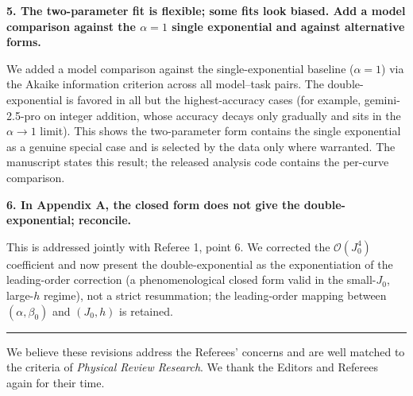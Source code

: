 \documentclass[11pt]{article}
\newcommand{\point}[1]{\medskip\noindent\textbf{#1}\par\nobreak}
\begin{document}
\point{5. The two-parameter fit is flexible; some fits look biased. Add a model comparison
against the $\alpha=1$ single exponential and against alternative forms.}
We added a model comparison against the single-exponential baseline ($\alpha=1$) via the Akaike
information criterion across all model--task pairs. The double-exponential is favored in all but
the highest-accuracy cases (for example, gemini-2.5-pro on integer addition, whose accuracy
decays only gradually and sits in the $\alpha\to1$ limit). This shows the two-parameter form
contains the single exponential as a genuine special case and is selected by the data only where
warranted. The manuscript states this result; the released analysis code contains the per-curve
comparison.

\point{6. In Appendix A, the closed form does not give the double-exponential; reconcile.}
This is addressed jointly with Referee 1, point 6. We corrected the $\mathcal{O}(J_0^4)$
coefficient and now present the double-exponential as the exponentiation of the leading-order
correction (a phenomenological closed form valid in the small-$J_0$, large-$h$ regime), not a
strict resummation; the leading-order mapping between $(\alpha,\beta_0)$ and $(J_0,h)$ is
retained.

\bigskip\hrule\bigskip

We believe these revisions address the Referees' concerns and are well matched to the criteria
of \textit{Physical Review Research}. We thank the Editors and Referees again for their time.
\end{document}
